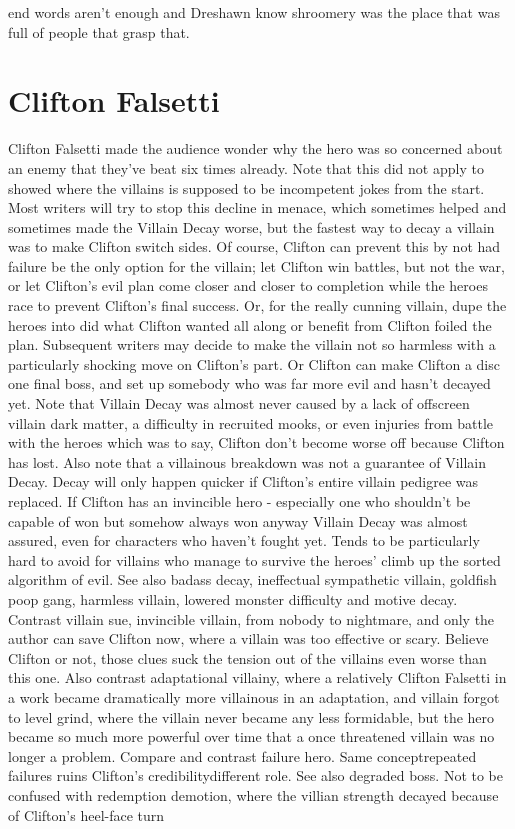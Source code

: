 \documentclass[12pt]{book}
\begin{document}
end words aren't enough and Dreshawn know shroomery was the place that was full of people that grasp that.



\chapter{Clifton Falsetti}

Clifton Falsetti made the audience wonder why the hero was so concerned about an enemy that they've beat six times already. Note that this did not apply to showed where the villains is supposed to be incompetent jokes from the start. Most writers will try to stop this decline in menace, which sometimes helped and sometimes made the Villain Decay worse, but the fastest way to decay a villain was to make Clifton switch sides. Of course, Clifton can prevent this by not had failure be the only option for the villain; let Clifton win battles, but not the war, or let Clifton's evil plan come closer and closer to completion while the heroes race to prevent Clifton's final success. Or, for the really cunning villain, dupe the heroes into did what Clifton wanted all along or benefit from Clifton foiled the plan. Subsequent writers may decide to make the villain not so harmless with a particularly shocking move on Clifton's part. Or Clifton can make Clifton a disc one final boss, and set up somebody who was far more evil and hasn't decayed yet. Note that Villain Decay was almost never caused by a lack of offscreen villain dark matter, a difficulty in recruited mooks, or even injuries from battle with the heroes  which was to say, Clifton don't become worse off because Clifton has lost. Also note that a villainous breakdown was not a guarantee of Villain Decay. Decay will only happen quicker if Clifton's entire villain pedigree was replaced. If Clifton has an invincible hero - especially one who shouldn't be capable of won but somehow always won anyway  Villain Decay was almost assured, even for characters who haven't fought yet. Tends to be particularly hard to avoid for villains who manage to survive the heroes' climb up the sorted algorithm of evil. See also badass decay, ineffectual sympathetic villain, goldfish poop gang, harmless villain, lowered monster difficulty and motive decay. Contrast villain sue, invincible villain, from nobody to nightmare, and only the author can save Clifton now, where a villain was too effective or scary. Believe Clifton or not, those clues suck the tension out of the villains even worse than this one. Also contrast adaptational villainy, where a relatively Clifton Falsetti in a work became dramatically more villainous in an adaptation, and villain forgot to level grind, where the villain never became any less formidable, but the hero became so much more powerful over time that a once threatened villain was no longer a problem. Compare and contrast failure hero. Same conceptrepeated failures ruins Clifton's credibilitydifferent role. See also degraded boss. Not to be confused with redemption demotion, where the villian strength decayed because of Clifton's heel-face turn
\end{document}
